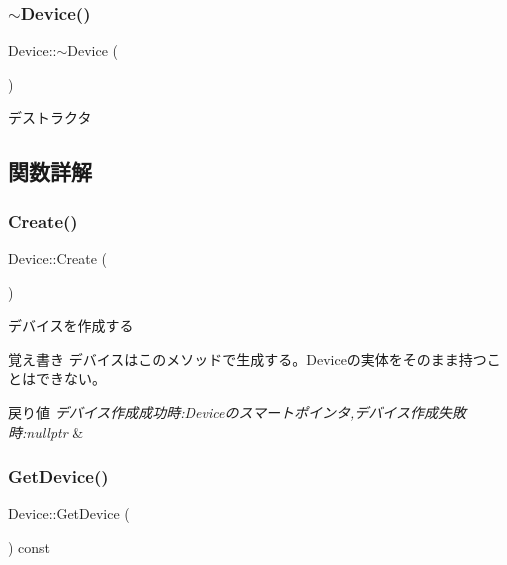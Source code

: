\subsubsection{\texorpdfstring{$\sim$\+Device()}{~Device()}}
{\footnotesize\ttfamily Device\+::$\sim$\+Device (\begin{DoxyParamCaption}{ }\end{DoxyParamCaption})}



デストラクタ 



\subsection{関数詳解}
\mbox{\label{class_device_a170367ef9b9851afbc42d004ceba713c}} 
\subsubsection{\texorpdfstring{Create()}{Create()}}
{\footnotesize\ttfamily Device\+::\+Create (\begin{DoxyParamCaption}{ }\end{DoxyParamCaption})\hspace{0.3cm}{\ttfamily [static]}}

デバイスを作成する \begin{DoxyNote}{覚え書き}
デバイスはこのメソッドで生成する。\+Deviceの実体をそのまま持つことはできない。 
\end{DoxyNote}

\begin{DoxyRetVals}{戻り値}
{\em デバイス作成成功時\+:\+Deviceのスマートポインタ,デバイス作成失敗時\+:nullptr} & \\
\hline
\end{DoxyRetVals}
\mbox{\label{class_device_a254f5a196d646fa7ef108fbe2d7ce8d6}} 
\subsubsection{\texorpdfstring{Get\+Device()}{GetDevice()}}
{\footnotesize\ttfamily Device\+::\+Get\+Device (\begin{DoxyParamCaption}{ }\end{DoxyParamCaption}) const}

